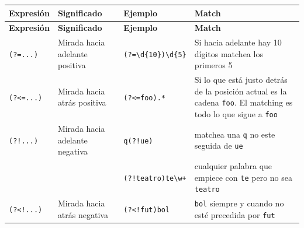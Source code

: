\documentclass[a4paper, 8pt]{extarticle}
\begin{document}
\begin{longtable}{@{} p{2cm} p{4.5cm} p{3cm} p{8cm} @{}}
\toprule
\textbf{Expresión} & \textbf{Significado} & \textbf{Ejemplo} & \textbf{Match} \\
\midrule
\endfirsthead
\toprule
\textbf{Expresión} & \textbf{Significado} & \textbf{Ejemplo} & \textbf{Match} \\
\midrule
\endhead
\bottomrule
\endfoot
\bottomrule
\endlastfoot

\centering \verb!(?=...)!  & Mirada hacia adelante positiva & \verb!(?=\d{10})\d{5}! & Si hacia adelante hay 10 dígitos matchea los primeros 5                                                                  \\
\centering \verb!(?<=...)! & Mirada hacia atrás positiva    & \verb!(?<=foo).*!      & Si lo que está justo detrás de la posición actual es la cadena \verb!foo!. El matching es todo lo que sigue a \verb!foo! \\
\centering \verb|(?!...)|  & Mirada hacia adelante negativa & \verb|q(?!ue)|         & matchea una \verb!q! no este seguida de \verb!ue!                                                                        \\
                           &                                & \verb|(?!teatro)te\w+| & cualquier palabra que empiece con \verb!te! pero no sea \verb!teatro!                                                    \\
\centering \verb|(?<!...)| & Mirada hacia atrás negativa    & \verb|(?<!fut)bol|     & \verb!bol! siempre y cuando no esté precedida por \verb!fut!                                                             \\
\end{longtable}
\end{document}
